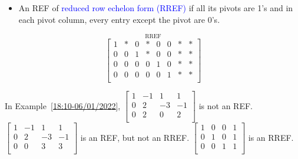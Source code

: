 \documentclass{beamer}
\theoremstyle{definition}
\theoremstyle{remark}
\begin{document}
\begin{frame}[t]
\begin{definition}
\begin{itemize}
\item An REF of \textcolor{blue}{reduced row echelon form (RREF)} if all its pivots are 1's and in each pivot column, every entry except the pivot are 0's.
\end{itemize}
\[
\overset{\text{RREF}}{\begin{bmatrix}
1&*&0&*&0&0&*&*\\
0&0&1&*&0&0&*&*\\
0&0&0&0&1&0&*&*\\
0&0&0&0&0&1&*&*\\
\end{bmatrix}
}
\]
\end{definition}
\pause
\begin{example}
In Example~\ref{18:10-06/01/2022}, $\begin{bmatrix}
1&-1&1&1\\
0&2&-3&-1\\
0&2&0&2\\
\end{bmatrix}$ is not an REF.
\pause
$\begin{bmatrix}
1&-1&1&1\\
0&2&-3&-1\\
0&0&3&3\\
\end{bmatrix}$ is an REF, but not an RREF.
\pause
$\begin{bmatrix}
1&0&0&1\\
0&1&0&1\\
0&0&1&1\\
\end{bmatrix}$ is an RREF.
\end{example}
\end{frame}
\end{document}
